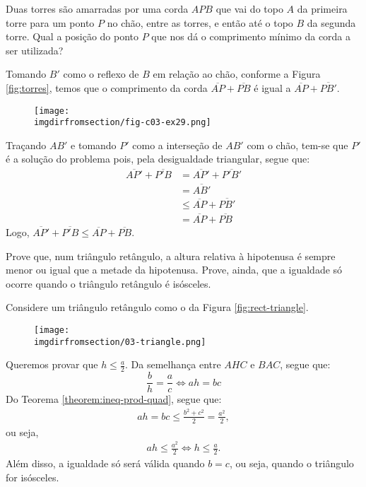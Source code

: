 \begin{example}
Duas torres são amarradas por uma corda $APB$ que vai do topo $A$ da primeira torre para um ponto $P$ no chão, entre as torres, e então
até o topo $B$ da segunda torre. Qual a posição do ponto $P$ que nos dá o comprimento mínimo da corda a ser utilizada?
\end{example}

\begin{solution}
Tomando $B'$ como o reflexo de $B$ em relação ao chão, conforme a Figura \ref{fig:torres}, temos que o comprimento da corda $\overline{AP} + \overline{PB}$ é igual a $\overline{AP} + \overline{PB'}$. 

\label{fig:torres}
\begin{figure}[H]
\texttt{[image: \\imgdirfromsection/fig-c03-ex29.png]}
\centering
\end{figure}

Traçando $AB'$ e tomando $P'$ como a interseção de $AB'$ com o chão, tem-se que $P'$ é a solução do problema pois, pela desigualdade triangular, segue que:
%
\begin{align*}
\overline{AP'} +\overline{P'B} & = \overline{AP'} +\overline{P'B'} \\
& = \overline{AB'} \\
& \le \overline{AP} +\overline{PB'} \\
& = \overline{AP} +\overline{PB} 
\end{align*}
%
Logo, $\overline{AP'} +\overline{P'B} \le \overline{AP} +\overline{PB}$.
\end{solution}

\begin{example}
Prove que, num triângulo retângulo, a altura relativa à hipotenusa é sempre menor ou igual que a metade da hipotenusa. Prove, ainda, que
a igualdade só ocorre quando o triângulo retângulo é isósceles.
\end{example}

\begin{solution}
Considere um triângulo retângulo como o da Figura \ref{fig:rect-triangle}.
%
\label{fig:rect-triangle}
\begin{figure}[H]
\texttt{[image: \\imgdirfromsection/03-triangle.png]}
\centering
\end{figure}
%
Queremos provar que $h \le \frac a 2$. Da semelhança entre $AHC$ e $BAC$, segue que:
%
\begin{equation*} 
\frac b h = \frac a c \iff ah = bc
\end{equation*} 
%
Do Teorema \ref{theorem:ineq-prod-quad}, segue que:
%
\begin{align*}
ah = bc \le \frac {b^2 + c^2} 2 = \frac {a^2} 2,
\end{align*}
%
ou seja, 
%
\begin{align*}
ah \le \frac {a^2} 2 \iff h \le \frac a 2.
\end{align*}
%
Além disso, a igualdade só será válida quando $b=c$, ou seja, quando o triângulo for isósceles.
\end{solution}

